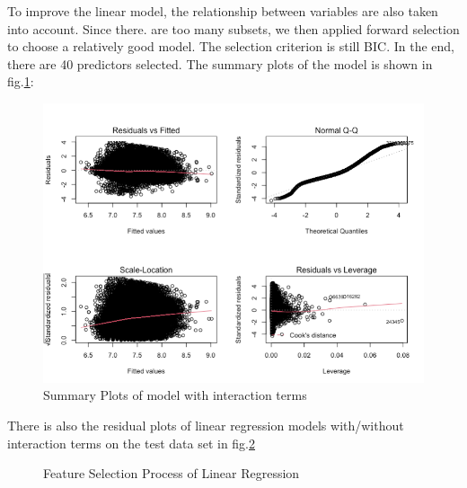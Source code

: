 \documentclass[letterpaper,12pt]{article}
\begin{document}
To improve the linear model, the relationship between variables are also taken into account. Since there. are too many subsets, we then applied forward selection to choose a relatively good model. The selection criterion is still BIC. In the end, there are 40 predictors selected. The summary plots of the model is shown in fig.\ref{fig8}:
\begin{figure}
\centering
    \includegraphics[width=0.7\linewidth]{8.png}
    \caption{Summary Plots of model with interaction terms}
    \label{fig8}
\end{figure}

There is also the residual plots of linear regression models with/without interaction terms on the test data set in fig.\ref{fig9}
\begin{figure}%
    \centering
    \qquad
    \caption{Feature Selection Process of Linear Regression}%
    \label{fig9}%
\end{figure}
\end{document}
